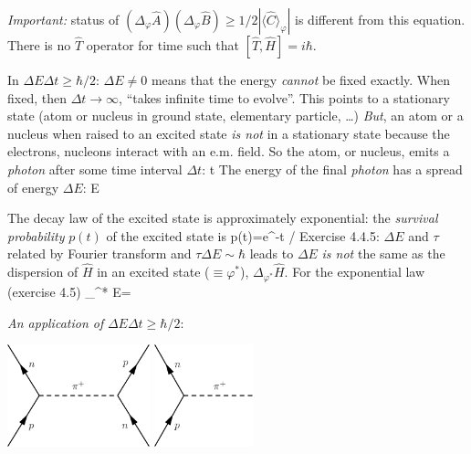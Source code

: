 \documentclass[12pt]{article}
\begin{document}
\emph{Important:} status of $\left(\Delta_{\varphi} \hat{A}\right)\left(\Delta_{\varphi} \hat{B}\right) \geqslant 1/2 |\langle\hat{C}\rangle_{\varphi}|$
is different from this equation. There is no
$\hat{T}$ operator for time such that
$[\hat{T},\hat{H}] = i\hbar$.

In $\Delta E \Delta t \geq \hbar / 2$: $\Delta E \neq 0$ means that the energy
\emph{cannot} be fixed exactly. When fixed,
then $\Delta t \to \infty$, ``takes infinite time
to evolve''. This points to a stationary state (atom or
nucleus in ground state, elementary particle, \ldots)
\emph{But}, an atom or a nucleus when raised
to an excited state \emph{is not} in a stationary
state because the electrons, nucleons
interact with an e.m. field.
So the atom, or nucleus, emits a \emph{photon}
after some time interval $\Delta t$:
\be
{} \to \Delta t \equiv \tau
\ee
The energy of the final \emph{photon} has
a spread of energy $\Delta E$:
\be
{} \to \Delta E \equiv \hbar \Gamma
\ee


The decay law of the excited state is approximately
exponential: the \emph{survival probability} $p(t)$
of the excited state is
\be
p(t)=e^{-t / \tau}
\ee
Exercise 4.4.5: $\Delta E$ and $\tau$ related by Fourier
transform and $\tau\Delta E \sim \hbar$ leads to
\be
\tau \Gamma {}
\ee
$\Delta E$ \emph{is not} the same as the dispersion of $\hat{H}$
in an excited state ($\equiv \varphi^*$), $\Delta_{\varphi^*} \hat{H}$.
For the exponential law (exercise 4.5)
\be
\Delta_{\varphi^*}  \gg \Delta E=\hbar \Gamma
\ee

\emph{An application of} $\Delta E \Delta t \geqslant \hbar / 2$: 

\begin{center}
\includegraphics[height=8em]{Figures/np-piplus-pn.pdf}\quad\quad%
\includegraphics[height=8em]{Figures/np-piplus.pdf}
\end{center}
\end{document}
